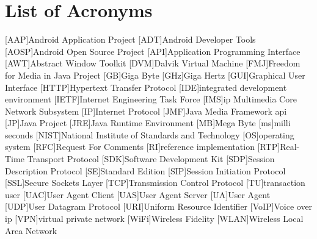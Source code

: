 

{}

\section*{List of Acronyms}

\begin{acronym}
	[AAP]{Android Application Project}
	[ADT]{Android Developer Tools}
	[AOSP]{Android Open Source Project}
	[API]{Application Programming Interface}
	[AWT]{Abstract Window Toolkit}
	[DVM]{Dalvik Virtual Machine}
	[FMJ]{Freedom for Media in Java Project}
	[GB]{Giga Byte}
	[GHz]{Giga Hertz}
	[GUI]{Graphical User Interface}
	[HTTP]{Hypertext Transfer Protocol}
	[IDE]{integrated development environment}
	[IETF]{Internet Engineering Task Force}
	[IMS]{\acs{ip} Multimedia Core Network Subsystem}
	[IP]{Internet Protocol}
	[JMF]{Java Media Framework \acs{api}}
	[JP]{Java Project}
	[JRE]{Java Runtime Environment}
	[MB]{Mega Byte}
	[ms]{milli seconds}
	[NIST]{National Institute of Standards and Technology}
	[OS]{operating system}
	[RFC]{Request For Comments}
	[RI]{reference implementation}
	[RTP]{Real-Time Transport Protocol}
	[SDK]{Software Development Kit}
	[SDP]{Session Description Protocol}
	[SE]{Standard Edition}
	[SIP]{Session Initiation Protocol}
	[SSL]{Secure Sockets Layer}
	[TCP]{Transmission Control Protocol}
	[TU]{transaction user}
	[UAC]{User Agent Client}
	[UAS]{User Agent Server}
	[UA]{User Agent}
	[UDP]{User Datagram Protocol}
	[URI]{Uniform Resource Identifier}
	[VoIP]{Voice over \acs{ip}}
	[VPN]{virtual private network}
	[WiFi]{Wireless Fidelity}
	[WLAN]{Wireless Local Area Network}
\end{acronym}	